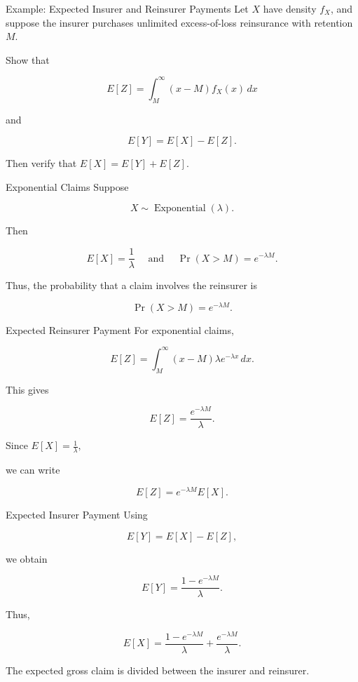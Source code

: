 \documentclass[
  ignorenonframetext,
  aspectratio=169,
]{beamer}
\begin{document}
\begin{frame}{Example: Expected Insurer and Reinsurer Payments}
\protect{}\label{example-expected-insurer-and-reinsurer-payments}
Let \(X\) have density \(f_X\), and suppose the insurer purchases
unlimited excess-of-loss reinsurance with retention \(M\).

Show that

\[
E[Z]
=
\int_M^\infty
(x-M)f_X(x)\,dx
\]

and

\[
E[Y]
=
E[X]-E[Z].
\]

Then verify that \(E[X]=E[Y]+E[Z].\)
\end{frame}

\begin{frame}{Exponential Claims}
\protect{}\label{exponential-claims-1}
Suppose

\[
X\sim\operatorname{Exponential}(\lambda).
\]

Then

\[
\boxed{
E[X]=\frac{1}{\lambda}
}
 \quad \text{ and } \quad 
\boxed{
\Pr(X>M)=e^{-\lambda M}.
}
\]

Thus, the probability that a claim involves the reinsurer is

\[
\boxed{
\Pr(X>M)=e^{-\lambda M}.
}
\]
\end{frame}

\begin{frame}{Expected Reinsurer Payment}
\protect{}\label{expected-reinsurer-payment-1}
For exponential claims,

\[
E[Z]
=
\int_M^\infty
(x-M)\lambda e^{-\lambda x}\,dx.
\]

This gives

\[
\boxed{
E[Z]
=
\frac{e^{-\lambda M}}{\lambda}.
}
\]

Since \(E[X]=\frac{1}{\lambda},\)

we can write

\[
\boxed{
E[Z]=e^{-\lambda M}E[X].
}
\]
\end{frame}

\begin{frame}{Expected Insurer Payment}
\protect{}\label{expected-insurer-payment-2}
Using

\[
E[Y]=E[X]-E[Z],
\]

we obtain

\[
\boxed{
E[Y]
=
\frac{1-e^{-\lambda M}}{\lambda}.
}
\]

Thus,

\[
\boxed{
E[X]
=
\frac{1-e^{-\lambda M}}{\lambda}
+
\frac{e^{-\lambda M}}{\lambda}.
}
\]

The expected gross claim is divided between the insurer and reinsurer.
\end{frame}
\end{document}
